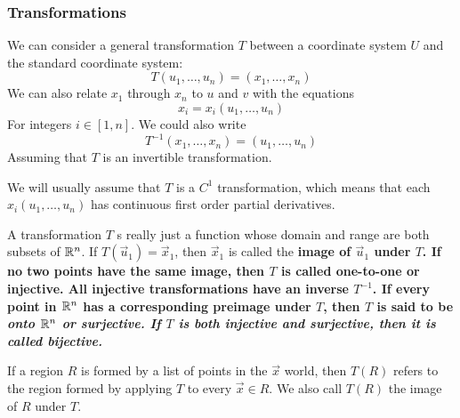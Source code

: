 \subsubsection{Transformations}
We can consider a general transformation $T$ between a coordinate system $U$ and the standard coordinate system:
\[ T(u_1, \dots, u_n) = (x_1, \dots, x_n) \]
We can also relate $x_1$ through $x_n$ to $u$ and $v$ with the equations
\[ x_i = x_i(u_1, \dots, u_n)\]
For integers $i\in[1,n]$. We could also write
\[  T^{-1}(x_1, \dots, x_n) = (u_1, \dots, u_n)\]
Assuming that $T$ is an invertible transformation. \par We will usually assume that $T$ is a $C^1$ transformation, which means that each $x_i(u_1, \dots, u_n)$ has continuous first order partial derivatives. \par
A transformation $T$ s really just a function whose domain and range are both subsets of $\mathbb{R}^n$. If $T(\vec u_1) = \vec x_1$, then $\vec x_1$ is called the \bf{image} of $\vec u_1$ under $T$. If no two points have the same image, then $T$ is called one-to-one or injective. All injective transformations have an inverse $T^{-1}$. If every point in $\mathbb{R}^n$ has a corresponding preimage under $T$, then $T$ is said to be \it{onto} $\mathbb{R}^n$ or surjective. If $T$ is both injective and surjective, then it is called \bf{bijective}. \par
If a region $R$ is formed by a list of points in the $\vec x$ world, then $T(R)$ refers to the region formed by applying $T$ to every $\vec x\in R$. We also call $T(R)$ the image of $R$ under $T$.
